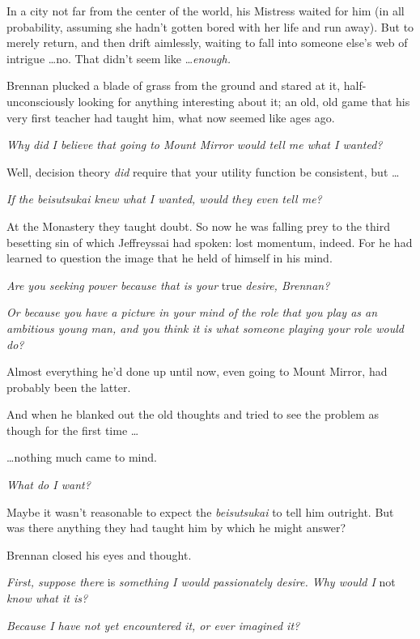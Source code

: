 {
 In a city not far from the center of the world, his Mistress
waited for him (in all probability, assuming she hadn't
gotten bored with her life and run away). But to merely return, and
then drift aimlessly, waiting to fall into someone
else's web of intrigue \ldots no. That
didn't seem like \ldots \textit{enough.}}

{
 Brennan plucked a blade of grass from the ground and stared at it,
half-unconsciously looking for anything interesting about it; an old,
old game that his very first teacher had taught him, what now seemed
like ages ago.}

{
 \textit{Why did I believe that going to Mount Mirror would tell me
what I wanted?}}

{
 Well, decision theory \textit{did} require that your utility
function be consistent, but \ldots}

{
 \textit{If the beisutsukai knew what I wanted, would they even
tell me?}}

{
 At the Monastery they taught doubt. So now he was falling prey to
the third besetting sin of which Jeffreyssai had spoken: lost momentum,
indeed. For he had learned to question the image that he held of
himself in his mind.}

{
 \textit{Are you seeking power because that is your} true
\textit{desire, Brennan?}}

{
 \textit{Or because you have a picture in your mind of the role}
\textit{that you play as an ambitious young man, and you think it is
what someone playing your role would do?}}

{
 Almost everything he'd done up until now, even
going to Mount Mirror, had probably been the latter.}

{
 And when he blanked out the old thoughts and tried to see the
problem as though for the first time \ldots}

{
 \ldots nothing much came to mind.}

{
 \textit{What do I want?}}

{
 Maybe it wasn't reasonable to expect the
\textit{beisutsukai} to tell him outright. But was there anything they
had taught him by which he might answer?}

{
 Brennan closed his eyes and thought.}

{
 \textit{First, suppose there} is \textit{something I would
passionately desire. Why would I} not \textit{know what it is?}}

{
 \textit{Because I have not yet encountered it, or ever imagined
it?}}

